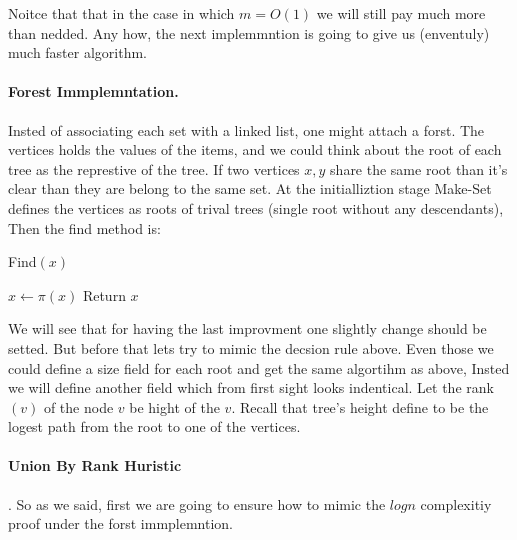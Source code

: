 Noitce that that in the case in which $m = O\left( 1 \right)$ we will still pay much more than nedded. Any how, the next implemmntion is going to give us (enventuly) much faster algorithm.

\paragraph{Forest Immplemntation.} Insted of associating each set with a linked list, one might attach a forst. The vertices holds the values of the items, and we could think about the root of each tree as the represtive of the tree. If two vertices $x,y$ share the same root than it's clear than they are belong to the same set. At the initialliztion stage Make-Set defines the vertices as roots of trival trees (single root without any descendants), Then the find method is: 
\begin{algbox}{Find$(x)$}
  \begin{algorithm}[H]
     { 
      $ x \leftarrow \pi\left( x \right)$
    }
    Return $x$ 
  \end{algorithm}    
\end{algbox}

  We will see that for having the last improvment one slightly change should be setted. But before that lets try to mimic the decsion rule above. Even those we could define a size field for each root and get the same algortihm as above, Insted we will define another field which from first sight looks indentical. Let the rank$\left( v \right)$ of the node $v$ be hight of the $v$. Recall that tree's height define to be the logest path from the root to one of the vertices. 
 
  \paragraph{Union By Rank Huristic  }. So as we said, first we are going to ensure how to mimic the $log n$ complexitiy proof under the forst immplemntion. 

